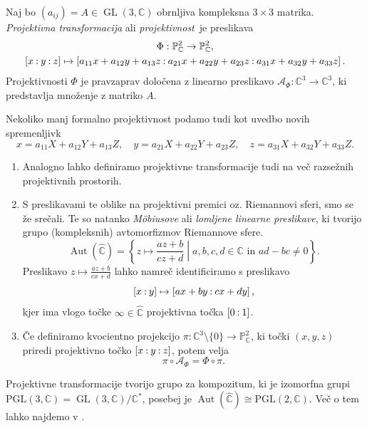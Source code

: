 \documentclass[mat1]{fmfdelo}
\numberwithin{equation}{section}
\newcommand{\C}{\mathbb C}
\newcommand{\CM}{\mathbb C ^*}
\newcommand{\PC}{\mathbb{P}^2_\C}
\newcommand{\RS}{\widehat{\C}}
\newcommand{\pcoor}[1]{%
\begingroup\lccode`~=`: \lowercase{\endgroup
\edef~}{\mathbin{\mathchar\the\mathcode`:}\nobreak}%
\left[%
\begingroup
\mathcode`:=\string"8000
#1%
\endgroup
\right]%
}
\newcommand{\kom}[1]{
    \underline{//#1}
}
\DeclareMathOperator{\GL}{GL}
\DeclareMathOperator{\Aut}{Aut}
\theoremstyle{definition}
\begin{document}
\begin{definicija}
    Naj bo $(a_{ij}) = A \in \GL(3, \C)$ obrnljiva kompleksna $3 \times 3$ matrika. \emph{Projektivna transformacija} ali \emph{projektivnost} je preslikava
        \begin{gather*}
            \Phi : \PC \to \PC,\\
            \pcoor{x:y:z} \mapsto \pcoor{a_{11}x + a_{12}y + a_{13}z: a_{21}x + a_{22}y + a_{23}z: a_{31}x + a_{32}y + a_{33}z}.
        \end{gather*}
    Projektivnosti $\Phi$ je pravzaprav določena z linearno preslikavo $\mathcal{A}_{\Phi} : \C^3 \to \C^3$, ki predstavlja množenje z matriko $A$.

    Nekoliko manj formalno projektivnost podamo tudi kot uvedbo novih spremenljivk 
    \[
        x = a_{11}X + a_{12}Y + a_{13}Z, \quad y = a_{21}X + a_{22}Y + a_{23}Z, \quad z = a_{31}X + a_{32}Y + a_{33}Z.  
    \]
\end{definicija}

\begin{opomba}
    \begin{enumerate}
        \item Analogno lahko definiramo projektivne transformacije tudi na več razsežnih projektivnih prostorih. 
        \item
        S preslikavami te oblike na projektivni premici oz. Riemannovi sferi, smo se že srečali. Te so natanko \emph{Möbiusove} ali \emph{lomljene linearne preslikave}, ki tvorijo grupo (kompleksnih) avtomorfizmov Riemannove sfere.
        $$\Aut(\RS) = \left\{ z \mapsto \frac{az + b}{cz +d} \middle\vert a,b,c,d \in \C \text{ in }  ad - bc \neq 0 \right\}.$$
        Preslikavo $z \mapsto \tfrac{az + b}{cx +d}$ lahko namreč identificiramo s preslikavo 
        \[
            \pcoor{x:y} \mapsto \pcoor{ax + by: cx + dy},  
        \]
        kjer ima vlogo točke $\infty \in \RS$ projektivna točka $\pcoor{0:1}$. 
        \item
        Če definiramo kvocientno projekcijo $\pi : \C^3 \setminus \{0\} \to \PC$, ki točki $(x,y,z)$ priredi projektivno točko $\pcoor{x:y:z}$, potem velja 
        $$\pi \circ \mathcal{A}_\Phi = \Phi \circ \pi.$$
    \end{enumerate}
\end{opomba}

Projektivne transformacije tvorijo grupo za kompozitum, ki je izomorfna grupi $\operatorname{PGL(3, \C)} = \GL(3,\C)/\CM$, posebej je $\Aut(\RS) \cong \operatorname{PGL(2,\C)}$. Več o tem lahko najdemo v \cite[poglavje 11]{Gibson}.
\end{document}
